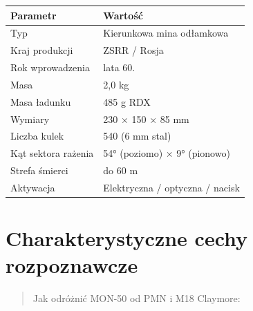 \documentclass[12pt,openany,oneside]{book}
\begin{document}
\begin{longtable}[]{@{}ll@{}}
\toprule\noalign{}
Parametr & Wartość \\
\midrule\noalign{}
\endhead
\bottomrule\noalign{}
\endlastfoot
Typ & Kierunkowa mina odłamkowa \\
Kraj produkcji & ZSRR / Rosja \\
Rok wprowadzenia & lata 60. \\
Masa & 2,0 kg \\
Masa ładunku & 485 g RDX \\
Wymiary & 230 × 150 × 85 mm \\
Liczba kulek & 540 (6 mm stal) \\
Kąt sektora rażenia & 54° (poziomo) × 9° (pionowo) \\
Strefa śmierci & do 60 m \\
Aktywacja & Elektryczna / optyczna / nacisk \\
\end{longtable}

\section{Charakterystyczne cechy
rozpoznawcze}\label{charakterystyczne-cechy-rozpoznawcze-112}

\begin{quote}
Jak odróżnić MON-50 od PMN i M18 Claymore:
\end{quote}
\end{document}
